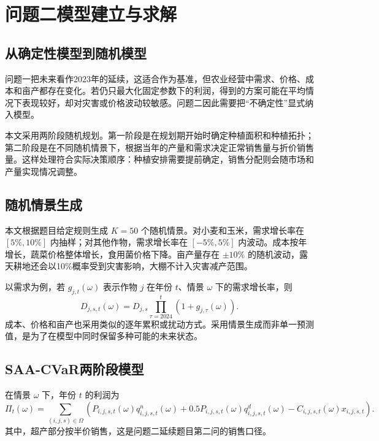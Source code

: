 \section{问题二模型建立与求解}

\subsection{从确定性模型到随机模型}

问题一把未来看作2023年的延续，这适合作为基准，但农业经营中需求、价格、成本和亩产都存在变化。若仍只最大化固定参数下的利润，得到的方案可能在平均情况下表现较好，却对灾害或价格波动较敏感。问题二因此需要把“不确定性”显式纳入模型。

本文采用两阶段随机规划。第一阶段是在规划期开始时确定种植面积和种植拓扑；第二阶段是在不同随机情景下，根据当年的产量和需求决定正常销售量与折价销售量。这样处理符合实际决策顺序：种植安排需要提前确定，销售分配则会随市场和产量实现情况调整。

\subsection{随机情景生成}

本文根据题目给定规则生成 $K=50$ 个随机情景。对小麦和玉米，需求增长率在 $[5\%,10\%]$ 内抽样；对其他作物，需求增长率在 $[-5\%,5\%]$ 内波动。成本按年增长，蔬菜价格整体增长，食用菌价格下降。亩产量存在 $\pm 10\%$ 的随机波动，露天耕地还会以10\%概率受到灾害影响，大棚不计入灾害减产范围。

以需求为例，若 $g_{j,t}(\omega)$ 表示作物 $j$ 在年份 $t$、情景 $\omega$ 下的需求增长率，则
\begin{equation}
D_{j,s,t}(\omega)=D_{j,s}\prod_{\tau=2024}^{t}\left(1+g_{j,\tau}(\omega)\right).
\end{equation}
成本、价格和亩产也采用类似的逐年累积或扰动方式。采用情景生成而非单一预测值，是为了在模型中同时保留多种可能的未来状态。

\subsection{SAA-CVaR两阶段模型}

在情景 $\omega$ 下，年份 $t$ 的利润为
\begin{equation}
\Pi_t(\omega)=\sum_{(i,j,s)\in\Omega}
\left(P_{i,j,s,t}(\omega)q^n_{i,j,s,t}(\omega)
 +0.5P_{i,j,s,t}(\omega)q^d_{i,j,s,t}(\omega)
 -C_{i,j,s,t}(\omega)x_{i,j,s,t}\right).
\end{equation}
其中，超产部分按半价销售，这是问题二延续题目第二问的销售口径。

